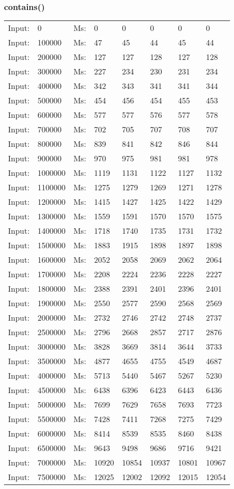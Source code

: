 \documentclass[11pt,a4paper]{report}
\begin{document}
\begin{tiny}
\subsubsection*{contains()}
\begin{tabular}{l l ||l  l  l  l  l  l}
Input:&0&Ms:&0&0&0&0&0\\
Input:&100000&Ms:&47&45&44&45&44\\
Input:&200000&Ms:&127&127&128&127&128\\
Input:&300000&Ms:&227&234&230&231&234\\
Input:&400000&Ms:&342&343&341&341&344\\
Input:&500000&Ms:&454&456&454&455&453\\
Input:&600000&Ms:&577&577&576&577&578\\
Input:&700000&Ms:&702&705&707&708&707\\
Input:&800000&Ms:&839&841&842&846&844\\
Input:&900000&Ms:&970&975&981&981&978\\
Input:&1000000&Ms:&1119&1131&1122&1127&1132\\
Input:&1100000&Ms:&1275&1279&1269&1271&1278\\
Input:&1200000&Ms:&1415&1427&1425&1422&1429\\
Input:&1300000&Ms:&1559&1591&1570&1570&1575\\
Input:&1400000&Ms:&1718&1740&1735&1731&1732\\
Input:&1500000&Ms:&1883&1915&1898&1897&1898\\
Input:&1600000&Ms:&2052&2058&2069&2062&2064\\
Input:&1700000&Ms:&2208&2224&2236&2228&2227\\
Input:&1800000&Ms:&2388&2391&2401&2396&2401\\
Input:&1900000&Ms:&2550&2577&2590&2568&2569\\
Input:&2000000&Ms:&2732&2746&2742&2748&2737\\
Input:&2500000&Ms:&2796&2668&2857&2717&2876\\
Input:&3000000&Ms:&3828&3669&3814&3644&3733\\
Input:&3500000&Ms:&4877&4655&4755&4549&4687\\
Input:&4000000&Ms:&5713&5440&5467&5267&5230\\
Input:&4500000&Ms:&6438&6396&6423&6443&6436\\
Input:&5000000&Ms:&7699&7629&7658&7693&7723\\
Input:&5500000&Ms:&7428&7411&7268&7275&7429\\
Input:&6000000&Ms:&8414&8539&8535&8460&8438\\
Input:&6500000&Ms:&9643&9498&9686&9716&9421\\
Input:&7000000&Ms:&10920&10854&10937&10801&10967\\
Input:&7500000&Ms:&12025&12002&12092&12015&12054\\
\end{tabular}
\\

\end{tiny}
\end{document}
